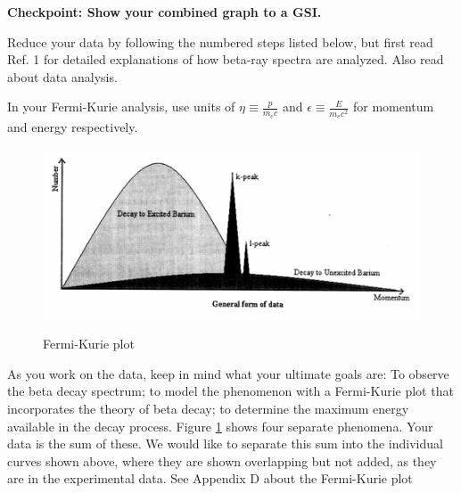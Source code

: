 \documentclass{../lab}
\begin{document}
\textbf{Checkpoint: Show your combined graph to a GSI.}

Reduce your data by following the numbered steps listed below, but first read Ref. 1 for detailed explanations of how beta-ray spectra are analyzed. Also read about data analysis.

In your Fermi-Kurie analysis, use units of $\eta \equiv \frac {p}{m_e c}$ and $\epsilon \equiv \frac{E}{m_e c^2}$ for momentum and energy respectively.

\begin{figure}
\centering
    \href{http://experimentationlab.berkeley.edu/sites/default/files/images/BRAimage025.gif}{\includegraphics[width=0.5\linewidth]{images/BRAimage025.png}}
    \caption{Fermi-Kurie plot}
    \label{fig:FermiKuriePlot}
\end{figure}

As you work on the data, keep in mind what your ultimate goals are: To observe the beta decay spectrum; to model the phenomenon with a Fermi-Kurie plot that incorporates the theory of beta decay; to determine the maximum energy available in the decay process. Figure \ref{fig:FermiKuriePlot} shows four separate phenomena. Your data is the sum of these. We would like to separate this sum into the individual curves shown above, where they are shown overlapping but not added, as they are in the experimental data. See Appendix D about the Fermi-Kurie plot
\end{document}
